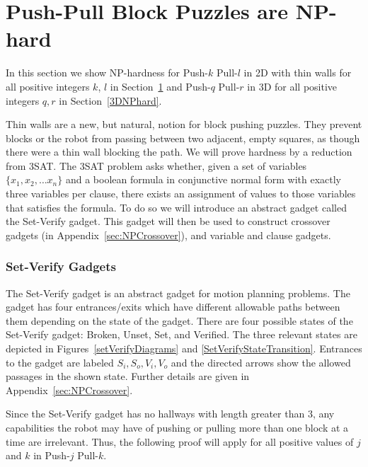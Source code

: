 
\section{Push-Pull Block Puzzles are NP-hard}
\label{2DNPhard}
In this section we show NP-hardness for Push-$k$ Pull-$l$ in 2D with thin walls for all positive integers $k$, $l$ in Section~\ref{2DNPhard} and Push-$q$ Pull-$r$ in 3D for all positive integers $q, r$ in Section~\ref{3DNPhard}. 

Thin walls are a new, but natural, notion for block pushing puzzles. They prevent blocks or the robot from passing between two adjacent, empty squares, as though there were a thin wall blocking the path. We will prove hardness by a reduction from 3SAT. The 3SAT problem asks whether, given a set of variables $\{x_1, x_2, \ldots x_n\}$ and a boolean formula in conjunctive normal form with exactly three variables per clause, there exists an assignment of values to those variables that satisfies the formula\cite{NPBook}. To do so we will introduce an abstract gadget called the Set-Verify gadget. This gadget will then be used to construct crossover gadgets (in Appendix~\ref{sec:NPCrossover}), and variable and clause gadgets.

\subsubsection{Set-Verify Gadgets}
\label{sec:SetVerifyGadgets}
The Set-Verify gadget is an abstract gadget for motion planning problems. The gadget has four entrances/exits which have different allowable paths between them depending on the state of the gadget. There are four possible states of the Set-Verify gadget: Broken, Unset, Set, and Verified. The three relevant states are depicted in Figures~\ref{setVerifyDiagrams} and \ref{SetVerifyStateTransition}. Entrances to the gadget are labeled $S_i, S_o, V_i, V_o$ and the directed arrows show the allowed passages in the shown state. Further details are given in Appendix~\ref{sec:NPCrossover}.

Since the Set-Verify gadget has no hallways with length greater than $3$, any capabilities the robot may have of pushing or pulling more than one block at a time are irrelevant. Thus, the following proof will apply for all positive values of $j$ and $k$ in Push-$j$ Pull-$k$.

